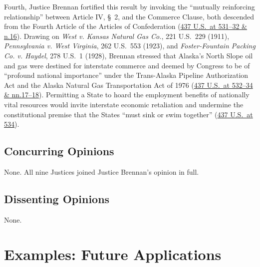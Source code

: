\documentclass[12pt]{article}
\begin{document}
Fourth, Justice Brennan fortified this result by invoking the ``mutually reinforcing relationship'' between Article IV, \S\ 2, and the Commerce Clause, both descended from the Fourth Article of the Articles of Confederation (\href{https://supreme.justia.com/cases/federal/us/437/518/}{437 U.S.\ at 531--32 \& n.16}). Drawing on \textit{West v. Kansas Natural Gas Co.}, 221 U.S.\ 229 (1911), \textit{Pennsylvania v. West Virginia}, 262 U.S.\ 553 (1923), and \textit{Foster-Fountain Packing Co. v. Haydel}, 278 U.S.\ 1 (1928), Brennan stressed that Alaska's North Slope oil and gas were destined for interstate commerce and deemed by Congress to be of ``profound national importance'' under the Trans-Alaska Pipeline Authorization Act and the Alaska Natural Gas Transportation Act of 1976 (\href{https://supreme.justia.com/cases/federal/us/437/518/}{437 U.S.\ at 532--34 \& nn.17--18}). Permitting a State to hoard the employment benefits of nationally vital resources would invite interstate economic retaliation and undermine the constitutional premise that the States ``must sink or swim together'' (\href{https://supreme.justia.com/cases/federal/us/437/518/}{437 U.S.\ at 534}).

\subsection{Concurring Opinions}

None. All nine Justices joined Justice Brennan's opinion in full.

\subsection{Dissenting Opinions}

None.

\section{Examples: Future Applications}
\end{document}
